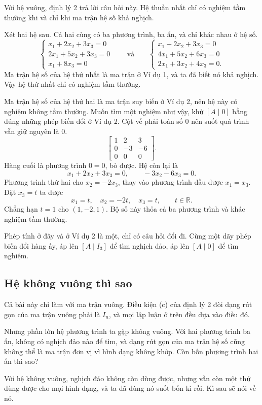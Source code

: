 \documentclass[12pt,a4paper]{article}
\begin{document}
Với hệ vuông, định lý 2 trả lời câu hỏi này. Hệ thuần nhất chỉ có nghiệm tầm thường khi và chỉ khi ma trận hệ số khả nghịch.

Xét hai hệ sau. Cả hai cùng có ba phương trình, ba ẩn, và chỉ khác nhau ở hệ số.
$$
\begin{cases}
x_1+2x_2+3x_3=0\\
2x_1+5x_2+3x_3=0\\
x_1+8x_3=0
\end{cases}
\qquad\text{và}\qquad
\begin{cases}
x_1+2x_2+3x_3=0\\
4x_1+5x_2+6x_3=0\\
2x_1+3x_2+4x_3=0.
\end{cases}
$$
Ma trận hệ số của hệ thứ nhất là ma trận ở Ví dụ 1, và ta đã biết nó khả nghịch. Vậy hệ thứ nhất chỉ có nghiệm tầm thường.

Ma trận hệ số của hệ thứ hai là ma trận suy biến ở Ví dụ 2, nên hệ này có nghiệm không tầm thường. Muốn tìm một nghiệm như vậy, khử \([A\mid0]\) bằng đúng những phép biến đổi ở Ví dụ 2. Cột vế phải toàn số \(0\) nên suốt quá trình vẫn giữ nguyên là \(0\).
$$
\left[ \begin{array}{rrr} 1 & 2 & 3\\ 0 & -3 & -6\\ 0 & 0 & 0 \end{array} \right].
$$
Hàng cuối là phương trình \(0=0\), bỏ được. Hệ còn lại là
$$
x_1+2x_2+3x_3=0,\qquad -3x_2-6x_3=0.
$$
Phương trình thứ hai cho \(x_2=-2x_3\), thay vào phương trình đầu được \(x_1=x_3\). Đặt \(x_3=t\) ta được
$$
x_1=t,\quad x_2=-2t,\quad x_3=t,\qquad t\in\mathbb R.
$$
Chẳng hạn \(t=1\) cho \((1,-2,1)\). Bộ số này thỏa cả ba phương trình và khác nghiệm tầm thường.

Phép tính ở đây và ở Ví dụ 2 là một, chỉ có câu hỏi đổi đi. Cùng một dãy phép biến đổi hàng ấy, áp lên \([A\mid I_3]\) để tìm nghịch đảo, áp lên \([A\mid0]\) để tìm nghiệm.

\subsection{Hệ không vuông thì sao}

Cả bài này chỉ làm với ma trận vuông. Điều kiện (c) của định lý 2 đòi dạng rút gọn của ma trận vuông phải là \(I_n\), và mọi lập luận ở trên đều dựa vào điều đó.

Nhưng phần lớn hệ phương trình ta gặp không vuông. Với hai phương trình ba ẩn, không có nghịch đảo nào để tìm, và dạng rút gọn của ma trận hệ số cũng không thể là ma trận đơn vị vì hình dạng không khớp. Còn bốn phương trình hai ẩn thì sao?

Với hệ không vuông, nghịch đảo không còn dùng được, nhưng vẫn còn một thứ dùng được cho mọi hình dạng, và ta đã dùng nó suốt bốn kì rồi. Kì sau sẽ nói về nó.
\end{document}
